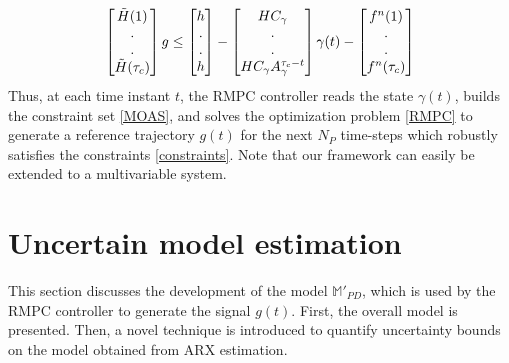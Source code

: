 \documentclass[letterpaper, 10 pt, conference]{ieeeconf}  %
\begin{document}
	 \begin{equation}
	 \begin{bmatrix}
	 \tilde{H}(1) \vspace{0.001cm} \\
	 . \vspace{0.001cm} \\
	 . \vspace{0.001cm} \\
	 \tilde{H}(\tau_c)
	 \end{bmatrix} g \leq
	 \begin{bmatrix}
	 h \vspace{0.001cm} \\
	 . \vspace{0.001cm} \\
	 . \vspace{0.001cm} \\
	 h
	 \end{bmatrix} - 
	 \begin{bmatrix}
	 HC_{\gamma} \vspace{0.001cm} \\
	 . \vspace{0.001cm} \\
	 . \vspace{0.001cm} \\
	 HC_{\gamma}A_{\gamma}^{\tau_c - t}
	 \end{bmatrix}\gamma(t) - 
	 \begin{bmatrix}
	 f^n(1) \vspace{0.001cm} \\
	 . \vspace{0.001cm} \\
	 . \vspace{0.001cm} \\
	 f^n(\tau_c)
	 \end{bmatrix}
	 \label{MOAS}
	 \end{equation}
	 Thus, at each time instant $t$, the RMPC controller reads the state $\gamma(t)$, builds the constraint set \eqref{MOAS}, and solves the optimization problem \eqref{RMPC} to generate a reference trajectory $g(t)$ for the next $N_P$ time-steps which robustly satisfies the constraints \eqref{constraints}. Note that our framework can easily be extended to a multivariable system.
	 
	\section{Uncertain model estimation}
	\label{Contribution}
	This section discusses the development of the model $\mathbb{M}'_{PD}$, which is used by the RMPC controller to generate the signal $g(t)$. First, the overall model is presented. Then, a novel technique is introduced to quantify uncertainty bounds on the model obtained from ARX estimation.
\end{document}
